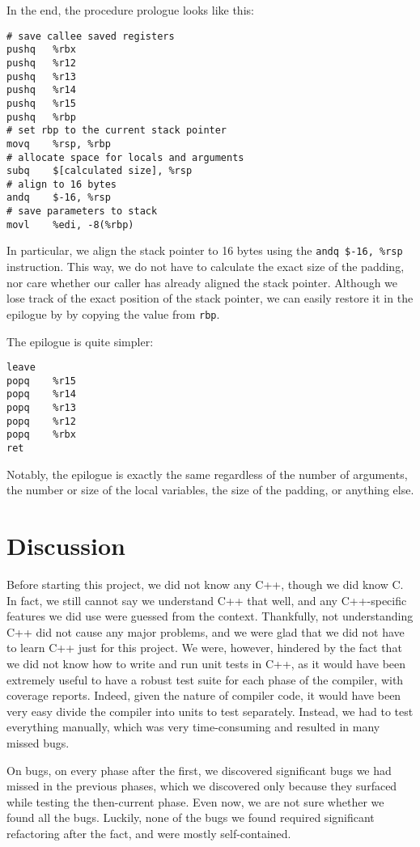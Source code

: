 \documentclass{article}
\begin{document}
In the end, the procedure prologue looks like this:

\begin{lstlisting}
# save callee saved registers
pushq   %rbx
pushq   %r12
pushq   %r13
pushq   %r14
pushq   %r15
pushq   %rbp
# set rbp to the current stack pointer
movq    %rsp, %rbp
# allocate space for locals and arguments
subq    $[calculated size], %rsp
# align to 16 bytes
andq    $-16, %rsp
# save parameters to stack
movl    %edi, -8(%rbp)
\end{lstlisting}

In particular, we align the stack pointer to 16 bytes using the \texttt{andq
	\$-16, \%rsp} instruction. This way, we do not have to calculate the exact size
of the padding, nor care whether our caller has already aligned the stack
pointer. Although we lose track of the exact position of the stack pointer, we
can easily restore it in the epilogue by by copying the value from \texttt{rbp}.

The epilogue is quite simpler:

\begin{lstlisting}
leave
popq    %r15
popq    %r14
popq    %r13
popq    %r12
popq    %rbx
ret
\end{lstlisting}

Notably, the epilogue is exactly the same regardless of the number of arguments,
the number or size of the local variables, the size of the padding, or anything
else.

\section{Discussion}

Before starting this project, we did not know any C++, though we did know C. In
fact, we still cannot say we understand C++ that well, and any C++-specific
features we did use were guessed from the context. Thankfully, not understanding
C++ did not cause any major problems, and we were glad that we did not have to
learn C++ just for this project. We were, however, hindered by the fact that we
did not know how to write and run unit tests in C++, as it would have been
extremely useful to have a robust test suite for each phase of the compiler,
with coverage reports. Indeed, given the nature of compiler code, it would have
been very easy divide the compiler into units to test separately. Instead, we
had to test everything manually, which was very time-consuming and resulted in
many missed bugs.

On bugs, on every phase after the first, we discovered significant bugs we had
missed in the previous phases, which we discovered only because they surfaced
while testing the then-current phase. Even now, we are not sure whether we found
all the bugs. Luckily, none of the bugs we found required significant
refactoring after the fact, and were mostly self-contained.
\end{document}
